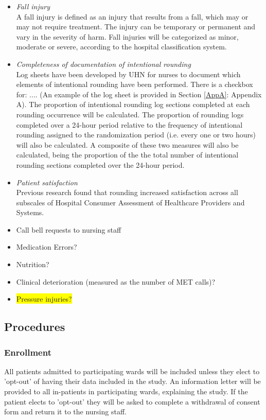\documentclass[12pt]{article}
\begin{document}
\begin{itemize}
    \item \textit{Fall injury}\\
    A fall injury is defined as an injury that results from a fall, which may or may not require treatment. The injury can be temporary or permanent and vary in the severity of harm. Fall injuries will be categorized as minor, moderate or severe, according to the hospital classification system.
    
    \item \textit{Completeness of documentation of intentional rounding}\\
    Log sheets have been developed by UHN for nurses to document which elements of intentional rounding have been performed. There is a checkbox for: .... (An example of the log sheet is provided in Section \ref{AppA}: Appendix A). The proportion of intentional rounding log sections completed at each rounding occurrence will be calculated. The proportion of rounding logs completed over a 24-hour period relative to the frequency of intentional rounding assigned to the randomization period (i.e. every one or two hours) will also be calculated. A composite of these two measures will also be calculated, being the proportion of the the total number of intentional rounding sections completed over the 24-hour period.
    \item \textit{Patient satisfaction} \\
    Previous research found that rounding increased satisfaction across all subscales of  Hospital Consumer Assessment of Healthcare Providers and Systems.\cite{brosey2015effectiveness} 
    \item Call bell requests to nursing staff
    \item Medication Errors?
    \item Nutrition?
    \item Clinical deterioration (measured as the number of MET calls)?
     \item \colorbox{yellow}{Pressure injuries?}
\end{itemize}


\subsection{Procedures}



\subsubsection{Enrollment}
All patients admitted to participating wards will be included unless they elect to 'opt-out' of having their data included in the study. An information letter will be provided to all in-patients in participating wards, explaining the study. If the patient elects to 'opt-out' they will be asked to complete a withdrawal of consent form and return it to the nursing staff.
\end{document}
